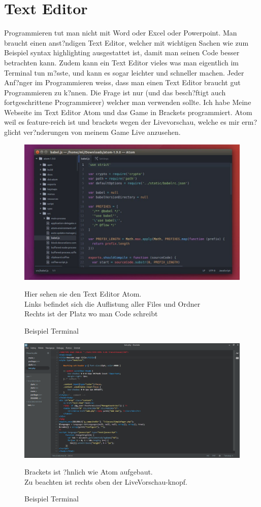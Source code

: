 \documentclass{article}
\begin{document}
\section{Text Editor}

Programmieren tut man nicht mit Word oder Excel oder Powerpoint.
Man braucht einen anst?ndigen Text Editor,
welcher mit wichtigen Sachen wie zum Beispiel syntax highlighting ausgestattet ist, damit man seinen Code besser betrachten kann.
Zudem kann ein Text Editor vieles was man eigentlich im Terminal tun m?sste, und kann es sogar leichter und schneller machen.
Jeder Anf?nger im Programmieren weiss, dass man einen Text Editor braucht gut Programmieren zu k?nnen.
Die Frage ist nur (und das besch?ftigt auch fortgeschrittene Programmierer) welcher man verwenden sollte.
Ich habe Meine Webseite im Text Editor Atom und das Game in Brackets programmiert.
Atom weil es feature-reich ist und brackets wegen der Livevorschau, welche es mir erm?glicht ver?nderungen von meinem Game Live anzusehen.
\begin{figure}[ht]
    \centering
    \includegraphics[width=.6\linewidth]{text-editor}
    \caption{Beispiel Terminal}
    \label{fig:sub1}{Hier sehen sie den Text Editor Atom.\\
    Links befindet sich die Auflistung aller Files und Ordner\\
    Rechts ist der Platz wo man Code schreibt}
    \end{figure}




    \begin{figure}[ht]
        \centering
        \includegraphics[width=.6\linewidth]{brackets}
        \caption{Beispiel Terminal}
        \label{fig:sub1}{Brackets ist ?hnlich wie Atom aufgebaut.\\
        Zu beachten ist rechts oben der LiveVorschau-knopf.}
        \end{figure}
\end{document}

